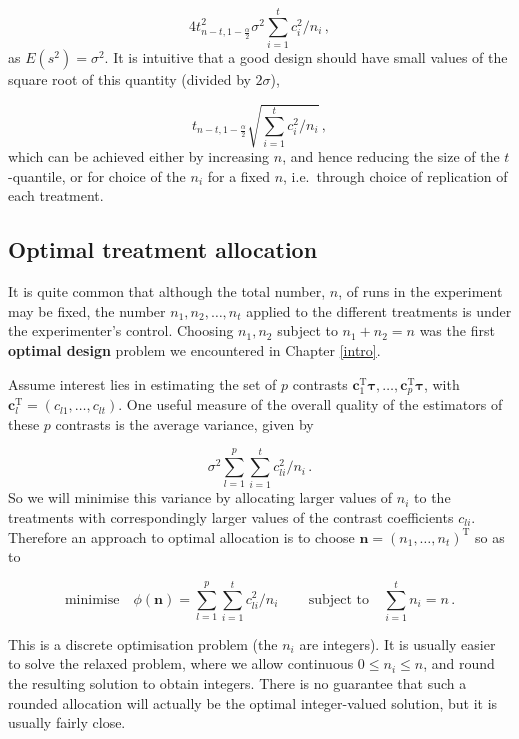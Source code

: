 \documentclass[
]{book}
\theoremstyle{definition}
\theoremstyle{definition}
\theoremstyle{definition}
\theoremstyle{definition}
\theoremstyle{remark}
\begin{document}
\[
4t^2_{n-t, 1-\frac{\alpha}{2}}\sigma^2\sum_{i=1}^tc_i^2/n_i\,,
\]
as \(E(s^2) = \sigma^2\). It is intuitive that a good design should have small values of the square root of this quantity (divided by \(2\sigma\)),

\[
t_{n-t, 1-\frac{\alpha}{2}}\sqrt{\sum_{i=1}^tc_i^2/n_i}\,,
\]
which can be achieved either by increasing \(n\), and hence reducing the size of the \(t\)-quantile, or for choice of the \(n_i\) for a fixed \(n\), i.e.~through choice of replication of each treatment.

\hypertarget{crd-opt-all}{%
\subsection{Optimal treatment allocation}\label{crd-opt-all}}

It is quite common that although the total number, \(n\), of runs in the experiment may be fixed, the number \(n_1, n_2, \ldots, n_t\) applied to the different treatments is under the experimenter's control. Choosing \(n_1, n_2\) subject to \(n_1+n_2 = n\) was the first \textbf{optimal design} problem we encountered in Chapter \ref{intro}.

Assume interest lies in estimating the set of \(p\) contrasts \(\boldsymbol{c}_1^{\mathrm{T}}\boldsymbol{\tau}, \ldots, \boldsymbol{c}_p^{\mathrm{T}}\boldsymbol{\tau}\), with \(\boldsymbol{c}_l^{\mathrm{T}} = (c_{l1}, \ldots, c_{lt})\). One useful measure of the overall quality of the estimators of these \(p\) contrasts is the average variance, given by

\[
\sigma^2\sum_{l=1}^p\sum_{i=1}^tc_{li}^2/n_i\,.
\]
So we will minimise this variance by allocating larger values of \(n_i\) to the treatments with correspondingly larger values of the contrast coefficients \(c_{li}\). Therefore an approach to optimal allocation is to choose \(\boldsymbol{n} = (n_1, \ldots, n_t)^{\mathrm{T}}\) so as to

\begin{equation}
\mbox{minimise} \quad \phi(\boldsymbol{n}) = \sum_{l=1}^p\sum_{i=1}^tc_{li}^2/n_i\,\qquad \mbox{subject to} \quad \sum_{i=1}^tn_i = n\,.
\label{eq:opt-all}
\end{equation}

This is a discrete optimisation problem (the \(n_i\) are integers). It is usually easier to solve the relaxed problem, where we allow continuous \(0\le n_i \le n\), and round the resulting solution to obtain integers. There is no guarantee that such a rounded allocation will actually be the optimal integer-valued solution, but it is usually fairly close.
\end{document}
